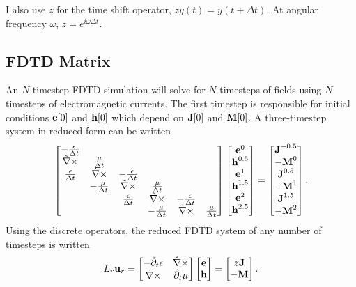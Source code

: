 %
I also use $z$ for the time shift operator, $z y(t) = y(t + \Delta t)$.  At angular frequency $\omega$, $z = e^{i \omega \Delta t}$.

\subsection{FDTD Matrix}

An $N$-timestep FDTD simulation will solve for $N$ timesteps of fields using $N$ timesteps of electromagnetic currents.  The first timestep is responsible for initial conditions $\textbf{e}[0]$ and $\textbf{h}[0]$ which depend on $\textbf{J}[0]$ and $\textbf{M}[0]$.  A three-timestep system in reduced form can be written
%
\begin{equation}
\begin{bmatrix}
- \frac{\epsilon}{\Delta t} & & & & & \\
\tilde{\nabla} \times & \frac{\mu}{\Delta t} & & & & \\
\frac{\epsilon}{\Delta t} & \hat{\nabla} \times & -\frac{\epsilon}{\Delta t} & & & \\
& -\frac{\mu}{\Delta t} & \tilde{\nabla} \times & \frac{\mu}{\Delta t} & &  \\
& & \frac{\epsilon}{\Delta t} & \hat{\nabla} \times & -\frac{\epsilon}{\Delta t} & \\
& & & -\frac{\mu}{\Delta t} & \tilde{\nabla} \times & \frac{\mu}{\Delta t}
\end{bmatrix}
%
\begin{bmatrix}
\ve e^0 \\ \ve h^{0.5} \\ \ve e^1 \\ \ve h^{1.5} \\ \ve e^2 \\ \ve h^{2.5}
\end{bmatrix}
=
\begin{bmatrix}
\ve J^{-0.5} \\ -\ve M^0 \\ \ve J^{0.5} \\ -\ve M^1 \\ \ve J^{1.5} \\ -\ve M^2 
\end{bmatrix}.
\label{eqn:fdtd_matrix_3_timesteps}
\end{equation}
%
Using the discrete operators, the reduced FDTD system of any number of timesteps is written
%
\begin{equation}
L_r \textbf{u}_r =
\begin{bmatrix}
-\tilde{\partial}_t \epsilon & \hat{\nabla}\times \\
\tilde{\nabla}\times & \hat{\partial}_t \mu
\end{bmatrix}
\begin{bmatrix} \textbf{e} \\ \textbf{h} \end{bmatrix}
=
\begin{bmatrix} z \textbf{J} \\ -\textbf{M} \end{bmatrix}.
\label{eqn:forwardSystem}
\end{equation}
